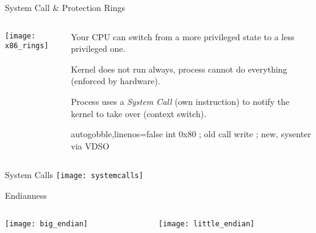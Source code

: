 \documentclass[beamer]{uibk}
\begin{document}
\begin{frame}[fragile]{System Call \& Protection Rings}
    \begin{columns}
        \begin{column}{0.55\textwidth}
            \texttt{[image: x86\_rings]}
        \end{column}
        \begin{column}{0.45\textwidth}
            Your CPU can switch from a more privileged state to a less
            privileged one.

            \bigskip

            Kernel does not run always, process cannot do everything (enforced
            by hardware).

            \bigskip

            Process uses a \emph{System Call} (own instruction) to notify the
            kernel to take over (context switch).

            \begin{nasmcode*}{autogobble,linenos=false}
                int   0x80   ; old
                call  write  ; new, sysenter via VDSO
            \end{nasmcode*}
        \end{column}
    \end{columns}
\end{frame}

\begin{frame}{System Calls}
    \texttt{[image: systemcalls]}
\end{frame}

\begin{frame}{Endianness}
    \begin{columns}
        \begin{column}{0.5\textwidth}
            \begin{center}
                \texttt{[image: big\_endian]}
            \end{center}
        \end{column}
        \begin{column}{0.5\textwidth}
            \begin{center}
                \texttt{[image: little\_endian]}
            \end{center}
        \end{column}
    \end{columns}
\end{frame}
\end{document}
